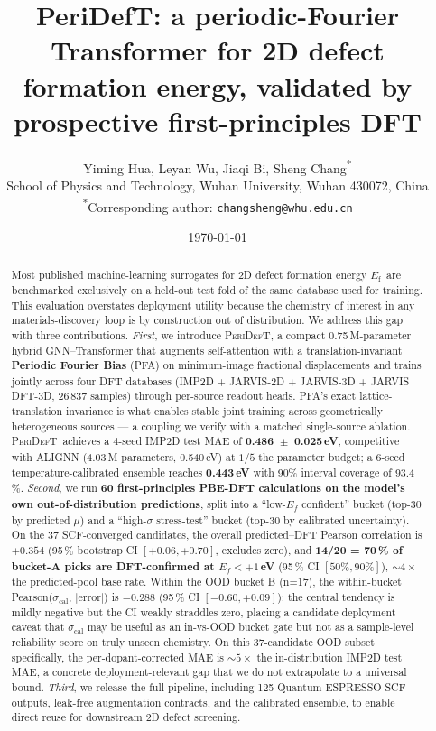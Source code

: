 \documentclass[11pt,a4paper]{article}
\title{\textbf{PeriDefT: a periodic-Fourier Transformer for 2D defect
formation energy, validated by prospective first-principles DFT}}
\author{%
  Yiming Hua, Leyan Wu, Jiaqi Bi, Sheng Chang\textsuperscript{*} \\[2pt]
  \small School of Physics and Technology, Wuhan University, Wuhan 430072, China \\[1pt]
  \small \textsuperscript{*}Corresponding author: \texttt{changsheng@whu.edu.cn}
}
\date{\today}
\newcommand{\Ef}{$E_{\mathrm{f}}$}
\newcommand{\modelname}{\textsc{PeriDefT}}
\begin{document}
\maketitle

\begin{abstract}
\noindent
Most published machine-learning surrogates for 2D defect formation
energy \Ef\ are benchmarked exclusively on a held-out test fold of
the same database used for training. This evaluation overstates
deployment utility because the chemistry of interest in any
materials-discovery loop is by construction out of distribution.
We address this gap with three contributions. \emph{First}, we
introduce \modelname, a compact 0.75\,M-parameter hybrid GNN--Transformer
that augments self-attention with a translation-invariant
\textbf{Periodic Fourier Bias} (PFA) on minimum-image fractional
displacements and trains jointly across four DFT databases
(IMP2D + JARVIS-2D + JARVIS-3D + JARVIS DFT-3D, 26\,837 samples)
through per-source readout heads. PFA's exact lattice-translation
invariance is what enables stable joint training across geometrically
heterogeneous sources --- a coupling we verify with a
matched single-source ablation. \modelname\ achieves a 4-seed
IMP2D test MAE of \textbf{0.486~$\pm$~0.025\,eV}, competitive with
ALIGNN (4.03\,M parameters, 0.540\,eV) at $1/5$ the parameter
budget; a 6-seed temperature-calibrated ensemble reaches
\textbf{0.443\,eV} with 90\% interval coverage of 93.4\,\%.
\emph{Second}, we run \textbf{60 first-principles PBE-DFT calculations
on the model's own out-of-distribution predictions}, split into a
``low-$E_f$ confident'' bucket (top-30 by predicted $\mu$) and a
``high-$\sigma$ stress-test'' bucket (top-30 by calibrated
uncertainty). On the 37 SCF-converged candidates, the overall
predicted--DFT Pearson correlation is $+0.354$ (95\,\% bootstrap
CI $[+0.06, +0.70]$, excludes zero), and \textbf{14/20 = 70\,\%
of bucket-A picks are DFT-confirmed at $E_f<+1$\,eV} (95\,\% CI
$[50\%, 90\%]$), $\sim 4\times$ the predicted-pool base rate.
Within the OOD bucket B (n=17), the within-bucket
Pearson($\sigma_{\mathrm{cal}}$, $|\mathrm{error}|$) is $-0.288$
(95\,\% CI $[-0.60, +0.09]$): the central tendency is mildly
negative but the CI weakly straddles zero, placing a candidate
deployment caveat that $\sigma_{\mathrm{cal}}$ may be useful as
an in-vs-OOD bucket gate but not as a sample-level reliability
score on truly unseen chemistry. On this 37-candidate OOD
subset specifically, the per-dopant-corrected MAE is $\sim 5\times$
the in-distribution IMP2D test MAE, a concrete deployment-relevant
gap that we do not extrapolate to a universal bound. \emph{Third}, we release the full pipeline, including
125 Quantum-ESPRESSO SCF outputs, leak-free augmentation contracts,
and the calibrated ensemble, to enable direct reuse for downstream
2D defect screening.
\end{abstract}
\end{document}
